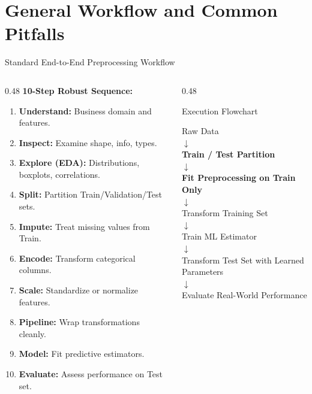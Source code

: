\documentclass[aspectratio=169,11pt]{beamer}
\begin{document}
\section{General Workflow and Common Pitfalls}

\begin{frame}{Standard End-to-End Preprocessing Workflow}
\begin{columns}[T]
\begin{column}{0.48\textwidth}
\textbf{10-Step Robust Sequence:}
\begin{enumerate}
  \item \textbf{Understand:} Business domain and features.
  \item \textbf{Inspect:} Examine shape, info, types.
  \item \textbf{Explore (EDA):} Distributions, boxplots, correlations.
  \item \textbf{Split:} Partition Train/Validation/Test sets.
  \item \textbf{Impute:} Treat missing values from Train.
  \item \textbf{Encode:} Transform categorical columns.
  \item \textbf{Scale:} Standardize or normalize features.
  \item \textbf{Pipeline:} Wrap transformations cleanly.
  \item \textbf{Model:} Fit predictive estimators.
  \item \textbf{Evaluate:} Assess performance on Test set.
\end{enumerate}
\end{column}
\begin{column}{0.48\textwidth}
\begin{block}{Execution Flowchart}
\scriptsize
\begin{center}
Raw Data \\
$\downarrow$ \\
\textbf{Train / Test Partition} \\
$\downarrow$ \\
\textbf{Fit Preprocessing on Train Only} \\
$\downarrow$ \\
Transform Training Set \\
$\downarrow$ \\
Train ML Estimator \\
$\downarrow$ \\
Transform Test Set with Learned Parameters \\
$\downarrow$ \\
Evaluate Real-World Performance
\end{center}
\end{block}
\end{column}
\end{columns}
\end{frame}
\end{document}
